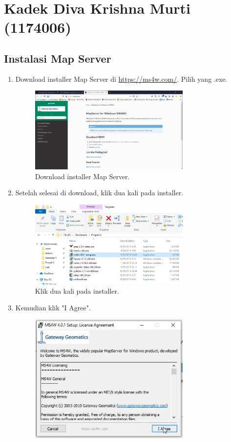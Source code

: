 \section{Kadek Diva Krishna Murti (1174006)}
\subsection{Instalasi Map Server}
\begin{enumerate}
	\item  Download installer Map Server di \href{https://ms4w.com/}{https://ms4w.com/}. Pilih yang .exe.
	\hfill\break
	\begin{figure}[H]
		\includegraphics[width=8cm]{figures/1174006/4/1.png}
		\centering
		\caption{Download installer Map Server.}
	\end{figure}
	\item  Setelah selesai di download, klik dua kali pada installer.
	\hfill\break
	\begin{figure}[H]
		\includegraphics[width=8cm]{figures/1174006/4/2.png}
		\centering
		\caption{Klik dua kali pada installer.}
	\end{figure}
	\item  Kemudian klik "I Agree".
	\hfill\break
	\begin{figure}[H]
		\includegraphics[width=8cm]{figures/1174006/4/3.png}

\end{figure}
\end{enumerate}
